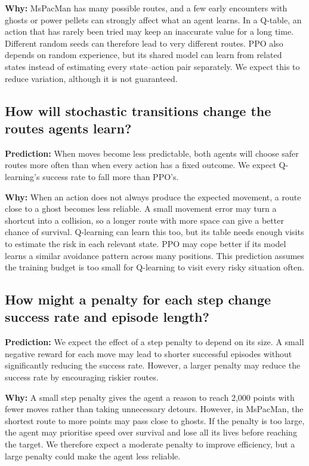 \textbf{Why:} MsPacMan has many possible routes, and a few early encounters with ghosts or power pellets can strongly affect what an agent learns. In a Q-table, an action that has rarely been tried may keep an inaccurate value for a long time. Different random seeds can therefore lead to very different routes. PPO also depends on random experience, but its shared model can learn from related states instead of estimating every state--action pair separately. We expect this to reduce variation, although it is not guaranteed.

\subsection{How will stochastic transitions change the routes agents learn?}
\textbf{Prediction:} When moves become less predictable, both agents will choose safer routes more often than when every action has a fixed outcome. We expect Q-learning's success rate to fall more than PPO's.

\textbf{Why:} When an action does not always produce the expected movement, a route close to a ghost becomes less reliable. A small movement error may turn a shortcut into a collision, so a longer route with more space can give a better chance of survival. Q-learning can learn this too, but its table needs enough visits to estimate the risk in each relevant state. PPO may cope better if its model learns a similar avoidance pattern across many positions. This prediction assumes the training budget is too small for Q-learning to visit every risky situation often.

\subsection{How might a penalty for each step change success rate and episode length?}
\textbf{Prediction:} We expect the effect of a step penalty to depend on its size. A small negative reward for each move may lead to shorter successful episodes without significantly reducing the success rate. However, a larger penalty may reduce the success rate by encouraging riskier routes.

\textbf{Why:} A small step penalty gives the agent a reason to reach 2,000 points with fewer moves rather than taking unnecessary detours. However, in MsPacMan, the shortest route to more points may pass close to ghosts. If the penalty is too large, the agent may prioritise speed over survival and lose all its lives before reaching the target. We therefore expect a moderate penalty to improve efficiency, but a large penalty could make the agent less reliable. 

